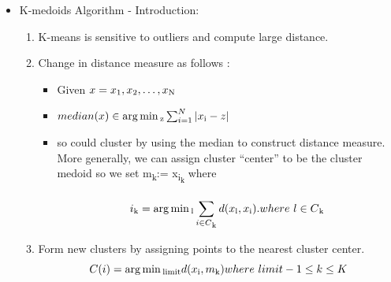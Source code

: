 \documentclass[a4paper,10pt]{article}
\DeclareMathOperator*{\argmin}{arg\,min}
\newcommand{\algrule}[1][.2pt]{\par\vskip.5\baselineskip\hrule height #1\par\vskip.5\baselineskip}
\begin{document}
\begin{itemize}
\item K-medoids Algorithm - Introduction:
\begin{enumerate}
        \item K-means is sensitive to outliers and compute large distance.
        \item Change in distance measure as follows :
        \begin{itemize}
        	\item Given ${x={x\textsubscript{1}, x\textsubscript{2},\dots, x\textsubscript{N}}}$
        	\item $ median(x) \in \argmin\textsubscript{z}\sum_{i=1}^{N}|x\textsubscript{i}-z|$
        	\item so could cluster by using the median to construct distance measure.
        	More generally, we can assign cluster “center” to be the cluster medoid so we set m\textsubscript{k}:= x\textsubscript{i\textsubscript{k}} where

        	\begin{equation*}
                 i\textsubscript{k} = \argmin\textsubscript{l} \sum_{i \in C\textsubscript{k}}^{ } d(x\textsubscript{l}, x\textsubscript{i}).
                 where \
                 l \in C\textsubscript{k}
        	\end{equation*}
        	 \end{itemize}
        \item Form new clusters by assigning points to the nearest cluster center.
        \begin{equation*}
           C(i) = \argmin\textsubscript{limit} d(x\textsubscript{i} , m\textsubscript{k})
           where \
            limit - 1\le k \le K
        \end{equation*}
\end{enumerate}
	\pagebreak
	\begin{itemize}
	

\end{itemize}
\end{itemize}
\end{document}
